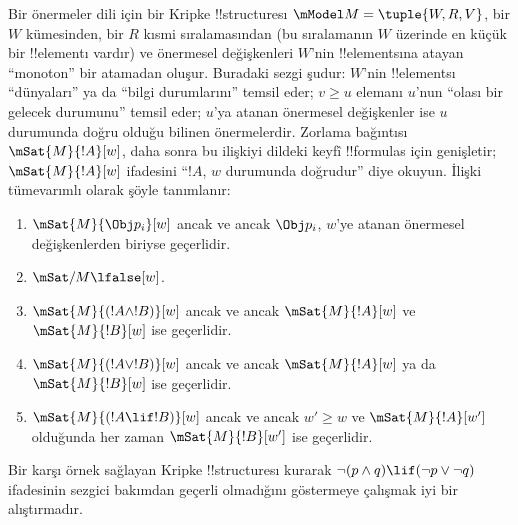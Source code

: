 Bir önermeler dili için bir Kripke !!{structure}{}sı
$\mModel M = \tuple{W, R, V}$, bir $W$ kümesinden, bir $R$ kısmi
sıralamasından (bu sıralamanın $W$ üzerinde en küçük bir !!{element}{}ı vardır) ve
önermesel değişkenleri $W$'nin !!{element}s{}ına atayan ``monoton'' bir atamadan
oluşur. Buradaki sezgi
şudur: $W$'nin !!{element}s{}ı ``dünyaları'' ya da ``bilgi durumlarını'' temsil
eder; $v \geq u$ elemanı $u$'nun ``olası bir gelecek durumunu'' temsil eder;
$u$'ya atanan önermesel değişkenler ise $u$ durumunda doğru olduğu bilinen
önermelerdir. Zorlama bağıntısı $\mSat{M}{!A}[w]$, daha sonra bu ilişkiyi
dildeki keyfî !!{formula}s için genişletir; $\mSat{M}{!A}[w]$ ifadesini
``$!A$, $w$ durumunda doğrudur'' diye okuyun. İlişki tümevarımlı olarak şöyle
tanımlanır:
\begin{enumerate}
\item $\mSat{M}{\Obj p_i}[w]$ ancak ve ancak $\Obj p_i$, $w$'ye atanan
  önermesel değişkenlerden biriyse geçerlidir.
\item $\mSat/{M}{\lfalse}[w]$.
\item $\mSat{M}{(!A \land !B)}[w]$ ancak ve ancak $\mSat{M}{!A}[w]$ ve
  $\mSat{M}{!B}[w]$ ise geçerlidir.
\item $\mSat{M}{(!A \lor !B)}[w]$ ancak ve ancak $\mSat{M}{!A}[w]$ ya da
  $\mSat{M}{!B}[w]$ ise geçerlidir.
\item $\mSat{M}{(!A \lif !B)}[w]$ ancak ve ancak $w' \geq w$ ve
  $\mSat{M}{!A}[w']$ olduğunda her zaman $\mSat{M}{!B}[w']$ ise geçerlidir.
\end{enumerate}
Bir karşı örnek sağlayan Kripke !!{structure}{}sı kurarak $\lnot (p \land q) \lif
(\lnot p \lor \lnot q)$ ifadesinin sezgici bakımdan geçerli olmadığını
göstermeye çalışmak iyi bir alıştırmadır.

